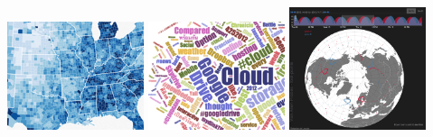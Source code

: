 \begin{frame}
\begin{center}
		\includegraphics[width=0.3\textwidth]{./images/futureWork4.png}\hspace{0.1cm}
		\includegraphics[width=0.3\textwidth]{./images/futureWork5.png}\hspace{0.1cm}
		\includegraphics[width=0.3\textwidth]{./images/futureWork6.png}
	\end{center}
\end{frame}

